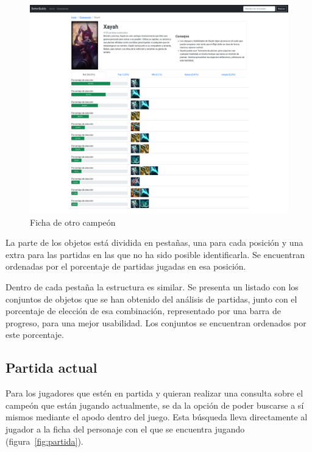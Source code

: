 \begin{figure}[h]
	\centering
	\includegraphics[width=1\linewidth]{img/4.campeon}
	\caption{Ficha de otro campeón}
	\label{fig:ficha2}
\end{figure}

La parte de los objetos está dividida en pestañas, una para cada posición y una extra para las partidas en las que no ha sido posible identificarla. Se encuentran ordenadas por el porcentaje de partidas jugadas en esa posición.

Dentro de cada pestaña la estructura es similar. Se presenta un listado con los conjuntos de objetos que se han obtenido del análisis de partidas, junto con el porcentaje de elección de esa combinación, representado por una barra de progreso, para una mejor usabilidad. Los conjuntos se encuentran ordenados por este porcentaje.

\subsection{Partida actual}\label{sec:partida}
Para los jugadores que estén en partida y quieran realizar una consulta sobre el campeón que están jugando actualmente, se da la opción de poder buscarse a sí mismos mediante el apodo dentro del juego. Esta búsqueda lleva directamente al jugador a la ficha del personaje con el que se encuentra jugando (figura~\ref{fig:partida}).

